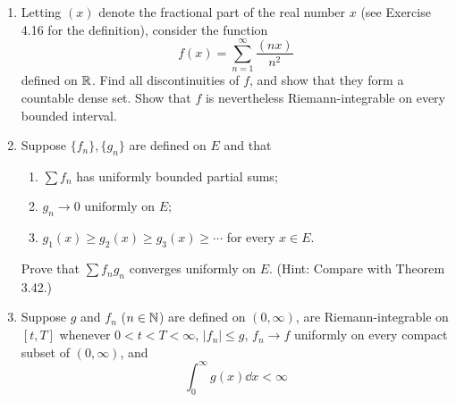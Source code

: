 \documentclass[../psets.tex]{subfiles}
\begin{document}
\begin{enumerate}[label={\textbf{\arabic*.}}]
\begin{proof}
        \begin{align*}
            |f_n(x_n)-f(x)| &\leq |f_n(x_n)-f(x_n)|+|f(x_n)-f(x)|\\
            &< \frac{\epsilon}{2}+\frac{\epsilon}{2}\\
            &= \epsilon
        \end{align*}
        as desired.\par
        No, it is not true in general that if $\{f_n\}$ is a sequence of continuous functions for which $\lim_{n\to\infty}f_n(x_n)=f(x)$ for every sequence of points $x_n\in E$ such that $x_n\to x$ and $x\in E$, then $f_n$ converges uniformly. Consider the sequence of functions from Exercise 7.5. This is a sequence of continuous functions for which $\lim_{n\to\infty}f_n(x_n)=f(x)$ for any sequence $\{x_n\}$ of the desired type since we can always choose $N$ large enough so that the moving "hump" and neighborhood of $x$ containing all remaining $x_n$ are separated forever more. Moreover, by Exercise 7.5, $\{f_n\}$ does not converge uniformly, as desired.
    \end{proof}
    \item Letting $(x)$ denote the fractional part of the real number $x$ (see Exercise 4.16 for the definition), consider the function
    \begin{equation*}
        f(x) = \sum_{n=1}^\infty\frac{(nx)}{n^2}
    \end{equation*}
    defined on $\mathbb{R}$. Find all discontinuities of $f$, and show that they form a countable dense set. Show that $f$ is nevertheless Riemann-integrable on every bounded interval.
    \item Suppose $\{f_n\},\{g_n\}$ are defined on $E$ and that
    \begin{enumerate}
        \item $\sum f_n$ has uniformly bounded partial sums;
        \item $g_n\to 0$ uniformly on $E$;
        \item $g_1(x)\geq g_2(x)\geq g_3(x)\geq\cdots$ for every $x\in E$.
    \end{enumerate}
    Prove that $\sum f_ng_n$ converges uniformly on $E$. (Hint: Compare with Theorem 3.42.)
    \item Suppose $g$ and $f_n$ ($n\in\mathbb{N}$) are defined on $(0,\infty)$, are Riemann-integrable on $[t,T]$ whenever $0<t<T<\infty$, $|f_n|\leq g$, $f_n\to f$ uniformly on every compact subset of $(0,\infty)$, and
    \begin{equation*}
        \int_0^\infty g(x)\dd{x} < \infty

\end{equation*}
\end{enumerate}
\end{document}
